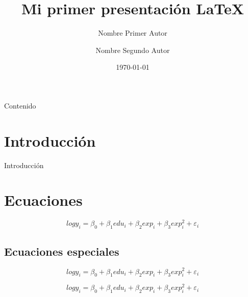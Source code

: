 \documentclass[11pt]{beamer}
\author[Autor1 y Autor2]{Nombre Primer Autor \and Nombre Segundo Autor}
\title{Mi primer presentación \LaTeX}
\institute[U.C.B.]{Universidad Católica Boliviana ``San Pablo"}
\date{\today}
\begin{document}
\begin{frame}
\titlepage
\end{frame}

\begin{frame}{Contenido}
\tableofcontents
\end{frame}

\section{Introducción}
\begin{frame}{Introducción}
\begin{itemize}
\medskip
{}
\bigskip
{}
\end{itemize}
\end{frame}

\section{Ecuaciones}
\begin{frame}
$$ log y_i = \beta_0 + \beta_1 edu_i + \beta_2 exp_i + \beta_3 exp^2_i + \varepsilon_i$$
\end{frame}

\subsection{Ecuaciones especiales}
\begin{frame}
$$ log y_i = \beta_0 + \beta_1 edu_i + \beta_2 exp_i + \beta_3 exp^2_i + \varepsilon_i$$
\end{frame}

\begin{frame}
$$ log y_i = \beta_0 + \beta_1 edu_i + \beta_2 exp_i + \beta_3 exp^2_i + \varepsilon_i$$
\end{frame}
\end{document}
